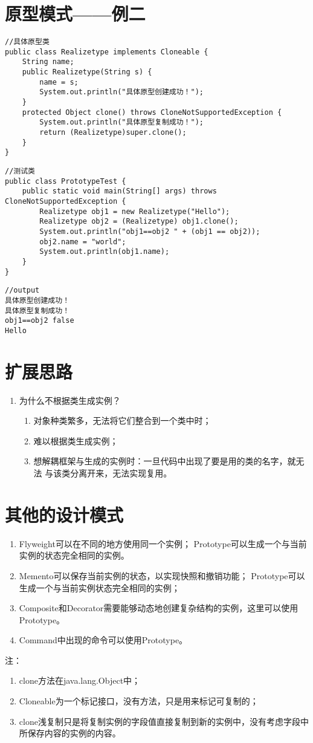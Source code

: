 \section{原型模式——例二}
\begin{lstlisting}
//具体原型类
public class Realizetype implements Cloneable {
	String name;
	public Realizetype(String s) {
		name = s;
		System.out.println("具体原型创建成功！");
	}
	protected Object clone() throws CloneNotSupportedException {
		System.out.println("具体原型复制成功！");
		return (Realizetype)super.clone();
	}
}
\end{lstlisting}
\begin{lstlisting}
//测试类
public class PrototypeTest {
	public static void main(String[] args) throws CloneNotSupportedException {
		Realizetype obj1 = new Realizetype("Hello");
		Realizetype obj2 = (Realizetype) obj1.clone();
		System.out.println("obj1==obj2 " + (obj1 == obj2));
		obj2.name = "world";
		System.out.println(obj1.name);
	}
}
\end{lstlisting}
\begin{lstlisting}
//output
具体原型创建成功！
具体原型复制成功！
obj1==obj2 false
Hello
\end{lstlisting}
\section{扩展思路}
\begin{enumerate}
	\item 为什么不根据类生成实例？
	\begin{enumerate}
		\item 对象种类繁多，无法将它们整合到一个类中时；
		\item 难以根据类生成实例；
		\item 想解耦框架与生成的实例时：一旦代码中出现了要是用的类的名字，就无法
		与该类分离开来，无法实现复用。
	\end{enumerate}
\end{enumerate}
\section{其他的设计模式}
\begin{enumerate}
	\item Flyweight可以在不同的地方使用同一个实例；
	Prototype可以生成一个与当前实例的状态完全相同的实例。
	\item Memento可以保存当前实例的状态，以实现快照和撤销功能；
	Prototype可以生成一个与当前实例状态完全相同的实例；
	\item Composite和Decorator需要能够动态地创建复杂结构的实例，这里可以使用
	Prototype。
	\item Command中出现的命令可以使用Prototype。
\end{enumerate}
注：
\begin{enumerate}
	\item clone方法在java.lang.Object中；
	\item Cloneable为一个标记接口，没有方法，只是用来标记可复制的；
	\item clone浅复制只是将复制实例的字段值直接复制到新的实例中，没有考虑字段中所保存内容的实例的内容。
\end{enumerate}